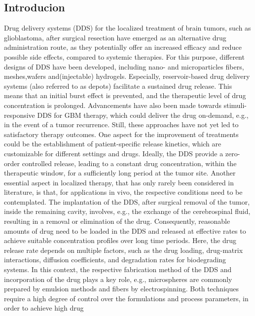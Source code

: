 \subsection{Introducion}
Drug delivery systems (DDS) for the localized treatment of brain tumors, such as glioblastoma, after surgical resection have emerged as an alternative drug administration route, as they potentially offer an increased efficacy and reduce possible side effects, compared to systemic therapies\supercite{de2010polymeric,pena2021design,wait2015polymeric,guerin2004recent,brem1991interstitial,li2020nanoparticle,tseng2021role,bastiancich2021rationally}. For this purpose, different designs of DDS have been developed, including nano- and microparticles\supercite{jain2016surface,gonzalez2015controlled,menei2004stereotaxic,bhaskaran2020current} fibers\supercite{norouzi2018salinomycin,fonseca2022electrospun}, meshes\supercite{han2019multi,di2021conformable},wafers\supercite{mcgirt2009gliadel,westphal2003phase} and(injectable) hydrogels\supercite{kang2021temperature,bastiancich2016anticancer}. Especially, reservoir-based drug delivery systems (also referred to as depots) facilitate a sustained drug release\supercite{wang2020electrospun,brudno2018replenishable}. This means that an initial burst effect is prevented, and the therapeutic level of drug concentration is prolonged\supercite{yu2022strategies}. Advancements have also been made towards stimuli-responsive DDS\supercite{graham2020tumor,lee2019flexible,wang2022silk} for GBM therapy, which could deliver the drug on-demand, e.g., in the event of a tumor recurrence. Still, these approaches have not yet led to satisfactory therapy outcomes. One aspect for the improvement of treatments could be the establishment of patient-specific release kinetics, which are customizable for different settings and drugs. Ideally, the DDS provide a zero-order controlled release, leading to a constant drug concentration, within the therapeutic window, for a sufficiently long period at the tumor site\supercite{fenton2018advances}. Another essential aspect in localized therapy, that has only rarely been considered in literature, is that, for applications in vivo, the respective conditions need to be contemplated. The implantation of the DDS, after surgical removal of the tumor, inside the remaining cavity, involves, e.g., the exchange of the cerebrospinal fluid\supercite{sweetman2011cerebrospinal,straehla2020pharmacokinetic}, resulting in a removal or elimination of the drug. Consequently, reasonable amounts of drug need to be loaded in the DDS and released at effective rates to achieve suitable concentration profiles over long time periods. Here, the drug release rate depends on multiple factors, such as the drug loading, drug-matrix interactions, diffusion coefficients, and degradation rates for biodegrading systems\supercite{stewart2018implantable}. In this context, the respective fabrication method of the DDS and incorporation of the drug plays a key role, e.g., microspheres are commonly prepared by emulsion methods\supercite{floyd2015drug} and fibers by electrospinning\supercite{chen2018emerging}. Both techniques require a high degree of control over the formulations and process parameters, in order to achieve high drug 